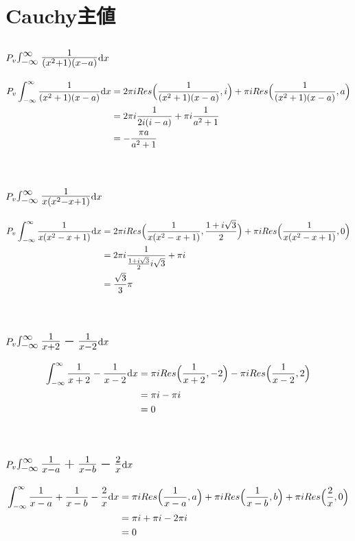 \documentclass[dvipdfmx,a4paper]{jsarticle}
\begin{document}
\section{Cauchy主値}
\subsection{$P_v\mbox{\Large$\int_{-\infty}^{\infty}\frac{1}{(x^2+1)(x-a)}$}\mathrm{d}x$}
\begin{align*}
P_v\int_{-\infty}^{\infty}\frac{1}{(x^2+1)(x-a)}\mathrm{d}x &= 2\pi i Res\Bigl(\frac{1}{(x^2+1)(x-a)}, i\Bigr) + \pi i Res\Bigl(\frac{1}{(x^2+1)(x-a)}, a\Bigr)\\
&= 2\pi i\frac{1}{2i(i-a)} + \pi i\frac{1}{a^2+1}\\
&= -\frac{\pi a}{a^2+1}
\end{align*}
\\

\subsection{$P_v\mbox{\Large$\int_{-\infty}^{\infty}\frac{1}{x(x^2 -x + 1)}$}\mathrm{d}x$}
\begin{align*}
P_v\int_{-\infty}^{\infty}\frac{1}{x(x^2 -x + 1)}\mathrm{d}x &= 2\pi i Res\Bigl(\frac{1}{x(x^2 -x + 1)}, \frac{1 + i\sqrt{3}}{2}\Bigr) + \pi i Res\Bigl(\frac{1}{x(x^2 -x + 1)}, 0\Bigr)\\
&= 2\pi i\frac{1}{\frac{1 + i\sqrt{3}}{2}i\sqrt{3}} + \pi i\\
&= \frac{\sqrt{3}}{3}\pi
\end{align*}
\\

\subsection{$P_v\mbox{\Large$\int_{-\infty}^{\infty}\frac{1}{x+2} - \frac{1}{x-2}$}\mathrm{d}x$}
\begin{align*}
\int_{-\infty}^{\infty}\frac{1}{x+2} - \frac{1}{x-2}\mathrm{d}x &= \pi i Res\Bigl(\frac{1}{x+2}, -2\Bigr) - \pi i Res\Bigl(\frac{1}{x-2}, 2\Bigr)\\
 &= \pi i - \pi i\\
 &= 0
\end{align*}
\\

\subsection{$P_v\mbox{\Large$\int_{-\infty}^{\infty}\frac{1}{x-a} + \frac{1}{x-b} - \frac{2}{x}$}\mathrm{d}x$}
\begin{align*}
\int_{-\infty}^{\infty}\frac{1}{x-a} + \frac{1}{x-b} - \frac{2}{x}\mathrm{d}x &= \pi i Res\Bigl(\frac{1}{x-a}, a\Bigr) + \pi i Res\Bigl(\frac{1}{x-b}, b\Bigr) + \pi i Res\Bigl(\frac{2}{x}, 0\Bigr)\\
 &= \pi i + \pi i - 2\pi i\\
 &= 0
\end{align*}
\end{document}
